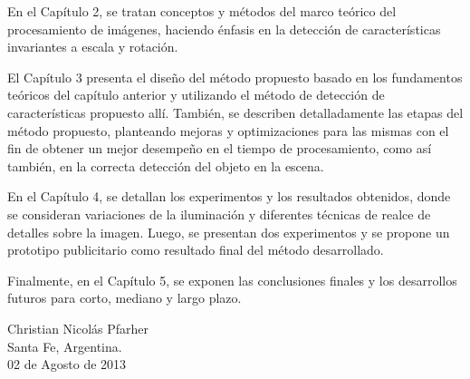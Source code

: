 En el Capítulo 2, se tratan conceptos y métodos del marco teórico del procesamiento de imágenes, haciendo énfasis en la detección de características invariantes a escala y rotación. %

El Capítulo 3 presenta el diseño del método propuesto basado en los fundamentos teóricos del capítulo anterior y utilizando el método de detección de características propuesto allí. También, se describen detalladamente las etapas del método propuesto, planteando mejoras y optimizaciones para las mismas con el fin de obtener un mejor desempeño en el tiempo de procesamiento, como así también, en la correcta detección del objeto en la escena.

En el Capítulo 4, se detallan los experimentos y los resultados obtenidos, donde se consideran variaciones de la iluminación y diferentes técnicas de realce de detalles sobre la imagen. Luego, se presentan dos experimentos y se propone un prototipo publicitario como resultado final del método desarrollado.

Finalmente, en el Capítulo 5, se exponen las conclusiones finales y los desarrollos futuros para corto, mediano y largo plazo.

\begin{flushright}
 Christian Nicolás Pfarher\\
 Santa Fe, Argentina. \\ 02 de Agosto de 2013
\end{flushright}

